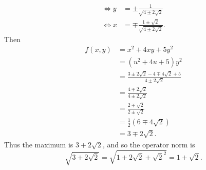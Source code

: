 \begin{example}
\begin{align*}
        \iff y &= \pm \frac1{\sqrt{4 \pm 2\sqrt 2}} \\
        \iff x &= \mp \frac{1 \pm \sqrt 2}{\sqrt{4 \pm 2\sqrt 2}}.
    \end{align*}
    Then \begin{align*}
        f(x, y) &= x^2 + 4xy + 5y^2 \\
        &= (u^2 + 4u + 5)y^2 \\
        &= \frac{3 \pm 2\sqrt 2 - 4 \mp 4 \sqrt 2 + 5}{4 \pm 2\sqrt 2} \\
        &= \frac{4 \mp 2\sqrt 2}{4 \pm 2\sqrt 2} \\
        &= \frac{2 \mp \sqrt 2}{2 \pm \sqrt 2} \\
        &= \frac12 (6 \mp 4\sqrt 2) \\
        &= 3 \mp 2\sqrt 2.
    \end{align*}
    Thus the maximum is $3 + 2\sqrt 2$, and so the operator norm is \[
        \sqrt{3 + 2\sqrt 2}
        = \sqrt{1 + 2 \sqrt 2 + \sqrt 2^2}
        = 1 + \sqrt 2.
    \]
\end{example}
